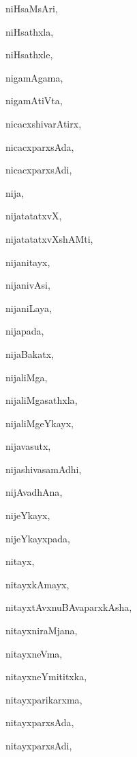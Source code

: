 \begin{multicols}{2}
{niHsaMsAri}, \pageref{niHsaMsAri}

{niHsathxla}, \pageref{niHsathxla}

{niHsathxle}, \pageref{niHsathxle}

{nigamAgama}, \pageref{nigamAgama}

{nigamAtiVta}, \pageref{nigamAtiVta}

{nicacxshivarAtirx}, \pageref{nicacxshivarAtirx}

{nicacxparxsAda}, \pageref{nicacxparxsAda}

{nicacxparxsAdi}, \pageref{nicacxparxsAdi}

{nija}, \pageref{nija}

{nijatatatxvX}, \pageref{nijatatatxvX}

{nijatatatxvXshAMti}, \pageref{nijatatatxvXshAMti}

{nijanitayx}, \pageref{nijanitayx}

{nijanivAsi}, \pageref{nijanivAsi}

{nijaniLaya}, \pageref{nijaniLaya}

{nijapada}, \pageref{nijapada}

{nijaBakatx}, \pageref{nijaBakatx}

{nijaliMga}, \pageref{nijaliMga}

{nijaliMgasathxla}, \pageref{nijaliMgasathxla}

{nijaliMgeYkayx}, \pageref{nijaliMgeYkayx}

{nijavasutx}, \pageref{nijavasutx}

{nijashivasamAdhi}, \pageref{nijashivasamAdhi}

{nijAvadhAna}, \pageref{nijAvadhAna}

{nijeYkayx}, \pageref{nijeYkayx}

{nijeYkayxpada}, \pageref{nijeYkayxpada}

{nitayx}, \pageref{nitayx}

{nitayxkAmayx}, \pageref{nitayxkAmayx}

{nitayxtAvxnuBAvaparxkAsha}, \pageref{nitayxtAvxnuBAvaparxkAsha}

{nitayxniraMjana}, \pageref{nitayxniraMjana}

{nitayxneVma}, \pageref{nitayxneVma}

{nitayxneYmititxka}, \pageref{nitayxneYmititxka}

{nitayxparikarxma}, \pageref{nitayxparikarxma}

{nitayxparxsAda}, \pageref{nitayxparxsAda}

{nitayxparxsAdi}, \pageref{nitayxparxsAdi}


\end{multicols}
